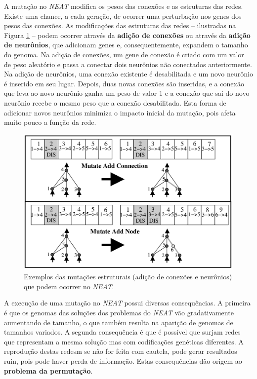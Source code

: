 A mutação no \textit{NEAT} modifica os pesos das conexões e as estruturas das
redes. Existe uma chance, a cada geração, de ocorrer uma perturbação nos genes
dos pesos das conexões. As modificações das estruturas das redes -- ilustradas
na Figura \ref{fig:neat-structural-mutation} -- podem ocorrer através da
\textbf{adição de conexões} ou através da \textbf{adição de neurônios}, que
adicionam genes e, consequentemente, expandem o tamanho do genoma. Na adição de
conexões, um gene de conexão é criado com um valor de peso aleatório e passa a
conectar dois neurônios não conectados anteriormente. Na adição de neurônios,
uma conexão existente é desabilitada e um novo neurônio é inserido em seu lugar.
Depois, duas novas conexões são inseridas, e a conexão que leva ao novo neurônio
ganha um peso de valor 1 e a conexão que sai do novo neurônio recebe o mesmo
peso que a conexão desabilitada. Esta forma de adicionar novos neurônios
minimiza o impacto inicial da mutação, pois afeta muito pouco a função da rede.

\begin{figure}[H]
\centering
\includegraphics[width=\textwidth]{fig/neat-mutation-examples.png}
\caption{Exemplos das mutações estruturais (adição de conexões e neurônios) que
podem ocorrer no \textit{NEAT}.}
\label{fig:neat-structural-mutation}
\end{figure}

A execução de uma mutação no \textit{NEAT} possui diversas consequências. A
primeira é que os genomas das soluções dos problemas do \textit{NEAT} vão
gradativamente aumentando de tamanho, o que também resulta na aparição de
genomas de tamanhos variados. A segunda consequência é que é possível que surjam
redes que representam a mesma solução mas com codificações genéticas diferentes.
A reprodução destas redesm se não for feita com cautela, pode gerar resultados
ruin, pois pode haver perda de informação. Estas consequências dão origem ao
\textbf{problema da permutação}.


